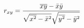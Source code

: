 \documentclass[preview]{standalone}
\begin{document}
\begin{align*}
\special{dvisvgm:raw <g id='unique000'>}r_{xy}=\frac{\overline{xy}-\bar{x}\bar{y}}{\sqrt{\overline{x^2}-\bar{x}^2}\sqrt{\overline{y^2}-\bar{y}^2}}\special{dvisvgm:raw </g>}
\end{align*}
\end{document}
